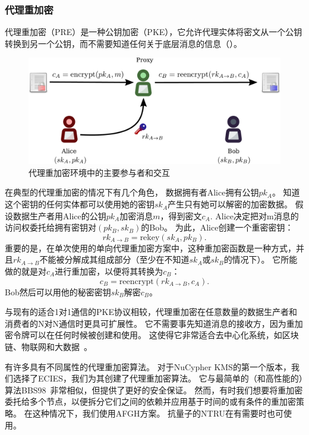 \documentclass[longbibliography,nofootinbib]{revtex4-1}
\newcommand{\kms}{NuCypher KMS}
\begin{document}
\subsubsection{代理重加密}
代理重加密（PRE）\cite{wiki:pre,nunez2017proxy}是一种公钥加密（PKE），它允许代理实体将密文从一个公钥转换到另一个公钥，而不需要知道任何关于底层消息的信息（）。

\begin{figure}
\centering
    \includegraphics[width=0.6\columnwidth]{pdf/pre.pdf}
    \caption{代理重加密环境中的主要参与者和交互}
    \label{fig:pre}
\end{figure}

在典型的代理重加密的情况下有几个角色，
数据拥有者Alice拥有公钥$pk_A$。
知道这个密钥的任何实体都可以使用她的密钥$sk_A$产生只有她可以解密的加密数据。
假设数据生产者用Alice的公钥$pk_A$加密消息$m$，得到密文$c_A$.
Alice决定把对m消息的访问权委托给拥有密钥对$(pk_B, sk_B)$的Bob。
为此，Alice创建一个重密密钥：
\begin{equation}
    rk_{A\rightarrow B} = \text{rekey}(sk_A, pk_B).
\end{equation}
重要的是，在单次使用的单向代理重加密方案中，这种重加密函数是一种方式，并且$rk_{A\rightarrow B}$不能被分解成其组成部分（至少在不知道$sk_A$或$sk_B$的情况下）。
它所能做的就是对$c_A$进行重加密，以便将其转换为$c_B$：
\begin{equation}
    c_B = \text{reencrypt}(rk_{A\rightarrow B}, c_{A}).
\end{equation}
Bob然后可以用他的秘密密钥$sk_B$解密$c_B$。

与现有的适合1对1通信的PKE协议相较，代理重加密在任意数量的数据生产者和消费者的N对N通信时更具可扩展性。
它不需要事先知道消息的接收方，因为重加密令牌可以在任何时候被创建和使用。
这使得它非常适合去中心化系统，如区块链、物联网和大数据~\cite{web:nucypher-hadoop}。

有许多具有不同属性的代理重加密算法。
对于\kms 的第一个版本，我们选择了ECIES，我们为其创建了代理重加密算法\cite{umbral-spec}。
它与最简单的（和高性能的）算法BBS98~\cite{BBS98}非常相似，但提供了更好的安全保证。
然而，有时我们想要将重加密委托给多个节点，以便拆分它们之间的依赖并应用基于时间的或有条件的重加密策略。
在这种情况下，我们使用AFGH方案\cite{AFGH}。
抗量子的NTRU在有需要时也可使用\cite{wiki:ntru,ntrureencrypt}。
\end{document}
